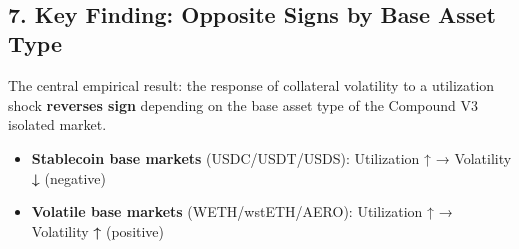 \documentclass[11pt]{article}
\providecommand{\tightlist}{%
      \setlength{\itemsep}{0pt}\setlength{\parskip}{0pt}}
\begin{document}
    \begin{center}
    \end{center}
    { \hspace*{\fill} \\}
    
    \subsection{7. Key Finding: Opposite Signs by Base Asset
Type}\label{key-finding-opposite-signs-by-base-asset-type}

The central empirical result: the response of collateral volatility to a
utilization shock \textbf{reverses sign} depending on the base asset
type of the Compound V3 isolated market.

\begin{itemize}
\tightlist
\item
  \textbf{Stablecoin base markets} (USDC/USDT/USDS): Utilization ↑ →
  Volatility \textbf{↓} (negative)
\item
  \textbf{Volatile base markets} (WETH/wstETH/AERO): Utilization ↑ →
  Volatility \textbf{↑} (positive)
\end{itemize}
\end{document}
